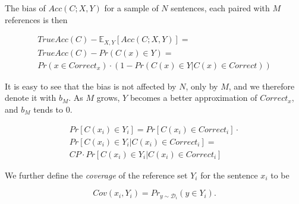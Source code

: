 \documentclass[letter,11pt]{article}
\begin{document}

                The bias of $Acc(C;X,Y)$ for a sample of $N$ sentences, each paired with $M$ references
                is then

                \begin{small}
                \begin{align*}
                  TrueAcc(C) - \mathbb{E}_{X,Y}\left[Acc(C;X,Y)\right] = \\
                  TrueAcc(C) - Pr(C(x) \in Y) = \\
                  Pr(x \in Correct_x) \cdot \left(1 - Pr(C(x) \in Y \vert C(x) \in Correct) \right)     
                \end{align*}
                \end{small}
                  
		It is easy to see that the bias is not affected by $N$, only by $M$, and we therefore denote it
                with $b_M$. As $M$ grows, $Y$ becomes a better approximation of $Correct_x$, and $b_M$ tends to 0.
                

                \begin{align}\label{eq:correction-in-gs}
		Pr[C(x_i) \in Y_i] = Pr[C(x_i) \in Correct_i] \cdot \\
		Pr[C(x_i) \in Y_i | C(x_i) \in Correct_i] = \nonumber \\
		CP\cdot Pr[C(x_i) \in Y_i | C(x_i) \in Correct_i]\nonumber
		\end{align}

                We further define the {\it coverage} of the reference set $Y_i$ for the sentence $x_i$ to be
		
		\begin{equation*}
		Cov\left(x_i,Y_i\right)=Pr_{y \sim \mathcal{D}_i}\left(y \in Y_i\right).
		\end{equation*}
                
\end{document}

